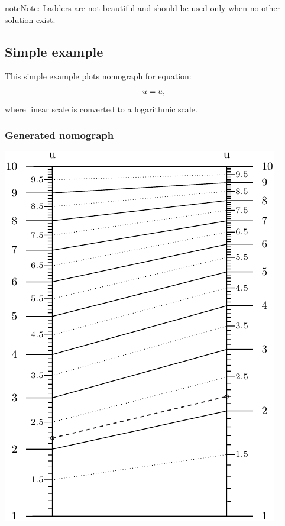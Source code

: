 \documentclass[a4paper,11pt,english]{sphinxmanual}
\begin{document}
\begin{notice}{note}{Note:}
Ladders are not beautiful and should be used only when no other solution exist.
\end{notice}


\subsection{Simple example}
\label{types/types:id38}
This simple example plots nomograph for equation:
\begin{gather}
\begin{split}u = u,\end{split}\notag
\end{gather}
where linear scale is converted to a logarithmic scale.


\subsubsection{Generated nomograph}
\label{types/types:id39}
\includegraphics{ex_type6_nomo_1.pdf}
\end{document}
